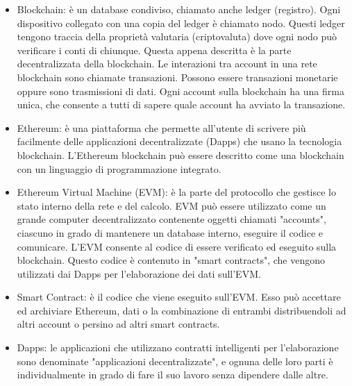 \begin{itemize}
\item Blockchain: \`e un database condiviso, chiamato anche ledger (registro). Ogni dispositivo collegato con una copia del ledger \`e chiamato nodo. Questi ledger tengono traccia della propriet\`a valutaria (criptovaluta) dove ogni nodo pu\`o verificare i conti di chiunque. Questa appena descritta \`e la parte decentralizzata della blockchain. Le interazioni tra account in una rete blockchain sono chiamate transazioni. Possono essere transazioni monetarie oppure sono trasmissioni di dati. Ogni account sulla blockchain ha una firma unica, che consente a tutti di sapere quale account ha avviato la transazione.
\item Ethereum: \`e una piattaforma che permette all'utente di scrivere pi\`u facilmente delle applicazioni decentralizzate (Dapps) che usano la tecnologia blockchain. L'Ethereum blockchain pu\`o essere descritto come una blockchain con un linguaggio di programmazione integrato.
\item Ethereum Virtual Machine (EVM): \`e la parte del protocollo che gestisce lo stato interno della rete e
del calcolo. EVM pu\`o essere utilizzato come un grande computer decentralizzato contenente
oggetti chiamati "accounts", ciascuno in grado di mantenere un database interno, eseguire il codice e comunicare. L'EVM consente al codice di essere verificato ed eseguito sulla blockchain. Questo codice \`e contenuto in "smart contracts", che vengono utilizzati dai Dapps per l'elaborazione dei dati
sull'EVM.
\item Smart Contract: \`e il codice che viene eseguito sull'EVM. Esso pu\`o accettare ed archiviare Ethereum, dati o la combinazione di entrambi distribuendoli ad altri account o persino ad altri smart contracts.
\item Dapps: le applicazioni che utilizzano contratti intelligenti per l'elaborazione sono denominate
"applicazioni decentralizzate", e ognuna delle loro parti \`e individualmente in grado di fare il suo lavoro senza dipendere dalle altre.


\end{itemize}
